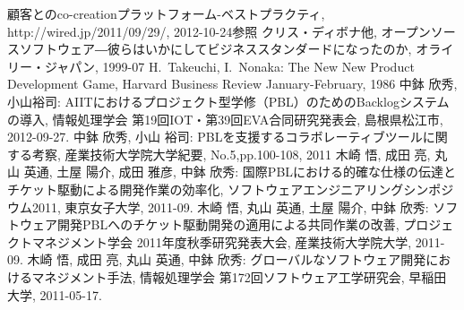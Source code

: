 \documentclass[a4j,9pt,twocolumn,twoside]{jsarticle}
\newcommand{\me}{中鉢 欣秀}
\begin{document}
	\vspace{1cm}
	\begin{thebibliography}{99}
		 顧客とのco-creationプラットフォーム-ベストプラクティ, 
                        http://wired.jp/2011/09/29/,  2012-10-24参照
         クリス・ディボナ他, オープンソースソフトウェア―彼らはいかにしてビジネススタンダードになったのか,
        				オライリー・ジャパン, 1999-07
		 H.~Takeuchi, I.~Nonaka: The New New Product Development Game, Harvard Business Review January-February, 1986
		 \me, 小山裕司: AIITにおけるプロジェクト型学修（PBL）のためのBacklogシステムの導入, 情報処理学会 第19回IOT・第39回EVA合同研究発表会, 島根県松江市, 2012-09-27. 
		\me, 小山 裕司: PBLを支援するコラボレーティブツールに関する考察, 産業技術大学院大学紀要, No.5,pp.100-108, 2011 
		 木崎 悟, 成田 亮, 丸山 英通, 土屋 陽介, 成田 雅彦, \me: 国際PBLにおける的確な仕様の伝達とチケット駆動による開発作業の効率化, ソフトウェアエンジニアリングシンポジウム2011, 東京女子大学, 2011-09.
		 木崎 悟, 丸山 英通, 土屋 陽介, \me: ソフトウェア開発PBLへのチケット駆動開発の適用による共同作業の改善, プロジェクトマネジメント学会 2011年度秋季研究発表大会, 産業技術大学院大学, 2011-09.
		 木崎 悟, 成田 亮, 丸山 英通, \me: グローバルなソフトウェア開発におけるマネジメント手法, 情報処理学会 第172回ソフトウェア工学研究会, 早稲田大学, 2011-05-17.

\end{thebibliography}
\end{document}
